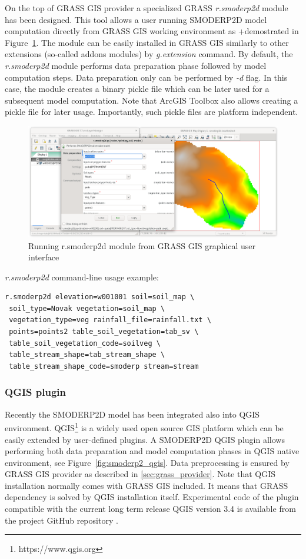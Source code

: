 On the top of GRASS GIS provider a specialized GRASS {\em r.smoderp2d}
module has been designed. This tool allows a user running SMODERP2D
model computation directly from GRASS GIS working environment as
+demostrated in Figure~\ref{fig:r.smoderp2d}. The module can be easily
installed in GRASS GIS similarly to other extensions (so-called addons
modules) by {\em g.extension} command. By default, the {\em
  r.smoderp2d} module performs data preparation phase followed by
model computation steps. Data preparation only can be performed by
{\em -d} flag. In this case, the module creates a binary pickle file
which can be later used for a subsequent model computation. Note that
ArcGIS Toolbox also allows creating a pickle file for later
usage. Importantly, such pickle files are platform independent.

\begin{figure}[ht!]
  \begin{center}
    \includegraphics[width=1.0\columnwidth]{figures/smoderp2d_grass.png}
    \caption{Running r.smoderp2d module from GRASS GIS graphical user interface}
    \label{fig:r.smoderp2d}
  \end{center}
\end{figure}

{\em r.smoderp2d} command-line usage example:
\begin{verbatim}
r.smoderp2d elevation=w001001 soil=soil_map \
 soil_type=Novak vegetation=soil_map \
 vegetation_type=veg rainfall_file=rainfall.txt \
 points=points2 table_soil_vegetation=tab_sv \
 table_soil_vegetation_code=soilveg \
 table_stream_shape=tab_stream_shape \
 table_stream_shape_code=smoderp stream=stream 
\end{verbatim}

\subsubsection{QGIS plugin}
Recently the SMODERP2D model has been integrated also into QGIS
environment. QGIS\footnote{https://www.qgis.org} is a widely used open
source GIS platform which can be easily extended by user-defined
plugins. A SMODERP2D QGIS plugin allows performing both data
preparation and model computation phases in QGIS native environment,
see Figure~\ref{fig:smoderp2_qgis}. Data preprocessing is ensured by
GRASS GIS provider as described in \ref{sec:grass_provider}. Note that
QGIS installation normally comes with GRASS GIS included. It means
that GRASS dependency is solved by QGIS installation
itself. Experimental code of the plugin compatible with the current
long term release QGIS version 3.4 is available from the project GitHub
repository \cite{smoderp2d-github-2019}.


